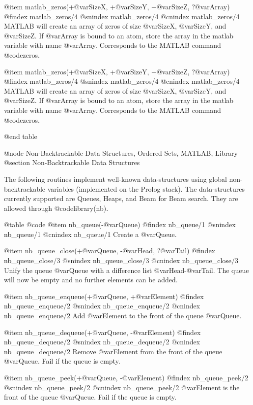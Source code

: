 {{{{{{{{@item matlab_zeros(+@var{SizeX}, +@var{SizeY}, +@var{SizeZ}, ?@var{Array})
@findex matlab_zeros/4
@snindex matlab_zeros/4
@cnindex matlab_zeros/4
MATLAB will create an array of zeros of size @var{SizeX}, @var{SizeY},
and @var{SizeZ}. If @var{Array} is bound to an atom, store the array
in the matlab variable with name @var{Array}.  Corresponds to the
MATLAB command @code{zeros}.


@item matlab_zeros(+@var{SizeX}, +@var{SizeY}, +@var{SizeZ}, ?@var{Array})
@findex matlab_zeros/4
@snindex matlab_zeros/4
@cnindex matlab_zeros/4
MATLAB will create an array of zeros of size @var{SizeX}, @var{SizeY},
and @var{SizeZ}. If @var{Array} is bound to an atom, store the array
in the matlab variable with name @var{Array}.  Corresponds to the
MATLAB command @code{zeros}.




@end table

@node Non-Backtrackable Data Structures, Ordered Sets, MATLAB, Library
@section Non-Backtrackable Data Structures

The following routines implement well-known data-structures using global
non-backtrackable variables (implemented on the Prolog stack). The
data-structures currently supported are Queues, Heaps, and Beam for Beam
search. They are allowed through @code{library(nb)}. 

@table @code
@item nb_queue(-@var{Queue})
@findex nb_queue/1
@snindex nb_queue/1
@cnindex nb_queue/1
Create a @var{Queue}.

@item nb_queue_close(+@var{Queue}, -@var{Head}, ?@var{Tail})
@findex nb_queue_close/3
@snindex nb_queue_close/3
@cnindex nb_queue_close/3
Unify the queue  @var{Queue} with a difference list
@var{Head}-@var{Tail}. The queue will now be empty and no further
elements can be added.

@item nb_queue_enqueue(+@var{Queue}, +@var{Element})
@findex nb_queue_enqueue/2
@snindex nb_queue_enqueue/2
@cnindex nb_queue_enqueue/2
Add @var{Element} to the front of the queue  @var{Queue}.

@item nb_queue_dequeue(+@var{Queue}, -@var{Element})
@findex nb_queue_dequeue/2
@snindex nb_queue_dequeue/2
@cnindex nb_queue_dequeue/2
Remove @var{Element} from the front of the queue  @var{Queue}. Fail if
the queue is empty.

@item nb_queue_peek(+@var{Queue}, -@var{Element})
@findex nb_queue_peek/2
@snindex nb_queue_peek/2
@cnindex nb_queue_peek/2
@var{Element} is the front of the queue  @var{Queue}. Fail if
the queue is empty.

}}}}}}}}
